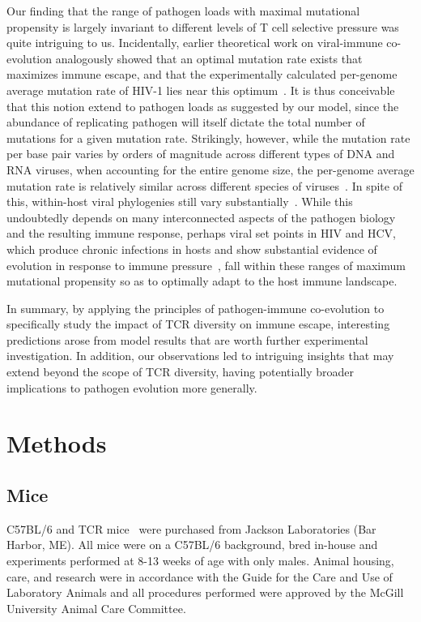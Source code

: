 Our finding that the range of pathogen loads with maximal mutational propensity is largely invariant to different levels of T cell selective pressure was quite intriguing to us. Incidentally, earlier theoretical work on viral-immune co-evolution analogously showed that an optimal mutation rate exists that maximizes immune escape, and that the experimentally calculated per-genome average mutation rate of HIV-1 lies near this optimum~\cite{kamp2002viral}. It is thus conceivable that this notion extend to pathogen loads as suggested by our model, since the abundance of replicating pathogen will itself dictate the total number of mutations for a given mutation rate. Strikingly, however, while the mutation rate per base pair varies by orders of magnitude across different types of DNA and RNA viruses, when accounting for the entire genome size, the per-genome average mutation rate is relatively similar across different species of viruses~\cite{sanjuan2016mechanisms,peck2018complexities}. In spite of this, within-host viral phylogenies still vary substantially~\cite{grenfell2004unifying}. While this undoubtedly depends on many interconnected aspects of the pathogen biology and the resulting immune response, perhaps viral set points in HIV and HCV, which produce chronic infections in hosts and show substantial evidence of evolution in response to immune pressure~\cite{grenfell2004unifying, raghwani2019high,lemey2006hiv}, fall within these ranges of maximum mutational propensity so as to optimally adapt to the host immune landscape. 

In summary, by applying the principles of pathogen-immune co-evolution to specifically study the impact of TCR diversity on immune escape, interesting predictions arose from model results that are worth further experimental investigation. In addition, our observations led to intriguing insights that may extend beyond the scope of TCR diversity, having potentially broader implications to pathogen evolution more generally.

\section{Methods}

\subsection{Mice}

C57BL/6  and TCR\textbeta{}\KO{} mice~\cite{mombaerts1992mutations} were purchased from Jackson Laboratories (Bar Harbor, ME). %
All mice were on a C57BL/6 background, bred in-house and experiments performed at 8-13 weeks of age with only males. Animal housing, care, and research were in accordance with the Guide for the Care and Use of Laboratory Animals and all procedures performed were approved by the McGill University Animal Care Committee.


